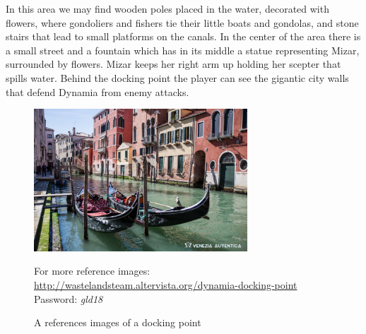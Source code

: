 In this area we may find wooden poles placed in the water, decorated with flowers, where gondoliers and fishers tie their little boats and gondolas, and  stone stairs that lead to small platforms on the canals. 
In the center of the area there is a small street and a fountain which has in its middle a statue representing Mizar, surrounded by flowers. Mizar keeps her right arm up holding her scepter that spills water.
Behind the docking point the player can see the gigantic city walls that defend Dynamia from enemy attacks.
\begin{figure}[H]
    \centering
    \includegraphics[width=8cm]{Images/Landmarks/dockingPoint}
    \caption{A references images of a docking point}
    For more reference images: \href{http://wastelandsteam.altervista.org/dynamia-docking-point}{http://wastelandsteam.altervista.org/dynamia-docking-point}\\Password: \textit{gld18}
  \end{figure}
